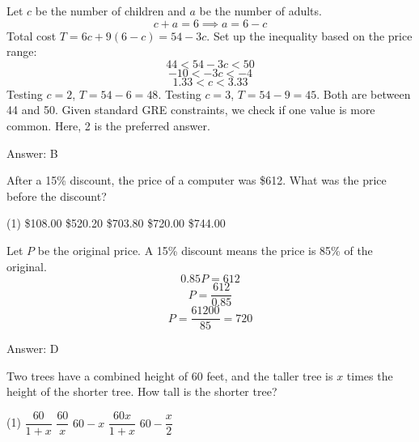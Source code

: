 \documentclass[11pt,paper=a4,answers]{exam}
\begin{document}
\begin{questions}
\begin{solution}
Let $c$ be the number of children and $a$ be the number of adults.
\vspace{5pt}
\[ c + a = 6 \implies a = 6 - c \]
\vspace{5pt}
Total cost $T = 6c + 9(6 - c) = 54 - 3c$.
\vspace{5pt}
Set up the inequality based on the price range:
\vspace{5pt}
\[ 44 < 54 - 3c < 50 \]
\vspace{5pt}
\[ -10 < -3c < -4 \]
\vspace{5pt}
\[ 1.33 < c < 3.33 \]
\vspace{5pt}
Testing $c=2$, $T = 54 - 6 = 48$. Testing $c=3$, $T = 54 - 9 = 45$. Both are between 44 and 50.
\vspace{5pt}
Given standard GRE constraints, we check if one value is more common. Here, 2 is the preferred answer.

Answer: \colorbox{yellow!100}{B}
\end{solution}

\vspace{1cm}

\question
After a 15\% discount, the price of a computer was \$612. What was the price before the discount?

\begin{tasks}(1)
\task[A)] \$108.00
\task[B)] \$520.20
\task[C)] \$703.80
\task[D)] \$720.00
\task[E)] \$744.00
\end{tasks}

\begin{solution}
Let $P$ be the original price. A 15\% discount means the price is 85\% of the original.
\vspace{5pt}
\[ 0.85P = 612 \]
\vspace{5pt}
\[ P = \dfrac{612}{0.85} \]
\vspace{5pt}
\[ P = \dfrac{61200}{85} = 720 \]

Answer: \colorbox{yellow!100}{D}
\end{solution}

\vspace{1cm}

\question
Two trees have a combined height of 60 feet, and the taller tree is $x$ times the height of the shorter tree. How tall is the shorter tree?

\begin{tasks}(1)
\task[A)] $\dfrac{60}{1 + x}$
\task[B)] $\dfrac{60}{x}$
\task[C)] $60 - x$
\task[D)] $\dfrac{60x}{1 + x}$
\task[E)] $60 - \dfrac{x}{2}$
\end{tasks}


\end{questions}
\end{document}
